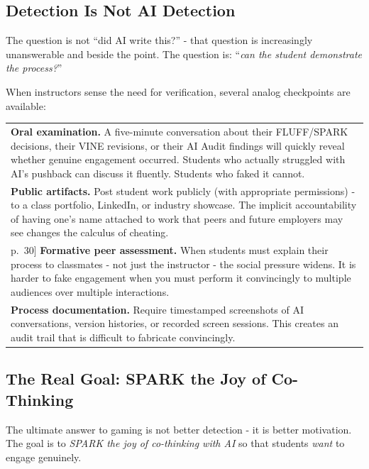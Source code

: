 \documentclass[
  letterpaper,
  DIV=11,
  numbers=noendperiod]{scrreprt}
\newcounter{none} %
\begin{document}
\subsection{Detection Is Not AI
Detection}\label{detection-is-not-ai-detection}

The question is not ``did AI write this?'' - that question is
increasingly unanswerable and beside the point. The question is:
``\emph{can the student demonstrate the process?}''

When instructors sense the need for verification, several analog
checkpoints are available:

{\def\LTcaptype{none} %
\begin{longtable}[]{@{}
  >{\raggedright\arraybackslash}p{}@{}}
\toprule\noalign{}
\endhead
\bottomrule\noalign{}
\endlastfoot
\textbf{Oral examination.} A five-minute conversation about their
FLUFF/SPARK decisions, their VINE revisions, or their AI Audit findings
will quickly reveal whether genuine engagement occurred. Students who
actually struggled with AI's pushback can discuss it fluently. Students
who faked it cannot. \\
\textbf{Public artifacts.} Post student work publicly (with appropriate
permissions) - to a class portfolio, LinkedIn, or industry showcase. The
implicit accountability of having one's name attached to work that peers
and future employers may see changes the calculus of cheating. \\
{[}p.~30{]} \textbf{Formative peer assessment.} When students must
explain their process to classmates - not just the instructor - the
social pressure widens. It is harder to fake engagement when you must
perform it convincingly to multiple audiences over multiple
interactions. \\
\textbf{Process documentation.} Require timestamped screenshots of AI
conversations, version histories, or recorded screen sessions. This
creates an audit trail that is difficult to fabricate convincingly. \\
\end{longtable}
}

\subsection{The Real Goal: SPARK the Joy of
Co-Thinking}\label{the-real-goal-spark-the-joy-of-co-thinking}

The ultimate answer to gaming is not better detection - it is better
motivation. The goal is to \emph{SPARK the joy of co-thinking with AI}
so that students \emph{want} to engage genuinely.
\end{document}
